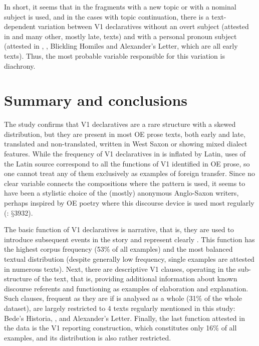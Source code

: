 \documentclass[output=paper,colorlinks,citecolor=brown]{langscibook}
\begin{document}
In short, it seems that in the fragments with a new topic or   with a nominal subject is used, and in the cases with topic continuation, there is a text-dependent variation between V1 declaratives without an overt subject (attested in  and many other, mostly late, texts) and with a personal pronoun subject (attested in , , Blickling Homiles and Alexander's Letter, which are all early texts). Thus, the most probable variable responsible for this variation is diachrony.


\section{Summary and conclusions}
\label{sec:cichosz:5}

The study confirms that V1 declaratives are a rare structure with a skewed distribution, but they are present in most OE prose texts, both early and late, translated and non-translated, written in West Saxon or showing mixed dialect features. While the frequency of V1 declaratives in  is inflated by Latin, uses  of the Latin source correspond to all the functions of V1 identified in OE prose, so one cannot treat any of them exclusively as examples of foreign transfer. Since no clear variable connects the compositions where the pattern is used, it seems to have been a stylistic choice of the (mostly) anonymous Anglo-Saxon writers, perhaps inspired by OE poetry where this discourse device is used most regularly (\citealt{Mitchell1985}: $§$3932).

The basic function of V1 declaratives is narrative, that is, they are used to introduce subsequent events in the story and represent clearly . This function has the highest corpus frequency (53\% of all examples) and the most balanced textual distribution (despite generally low frequency, single examples are attested in numerous texts). Next, there are descriptive V1 clauses, operating in the sub-structure of the text, that is, providing additional information about known discourse referents and functioning as examples of elaboration and explanation. Such clauses, frequent as they are if  is analysed as a whole (31\% of the whole dataset), are largely restricted to 4 texts regularly mentioned in this study: Bede's Historia, ,  and Alexander's Letter. Finally, the last function attested in the data is the V1 reporting construction, which constitutes only 16\% of all examples, and its distribution is also rather restricted.
\end{document}
